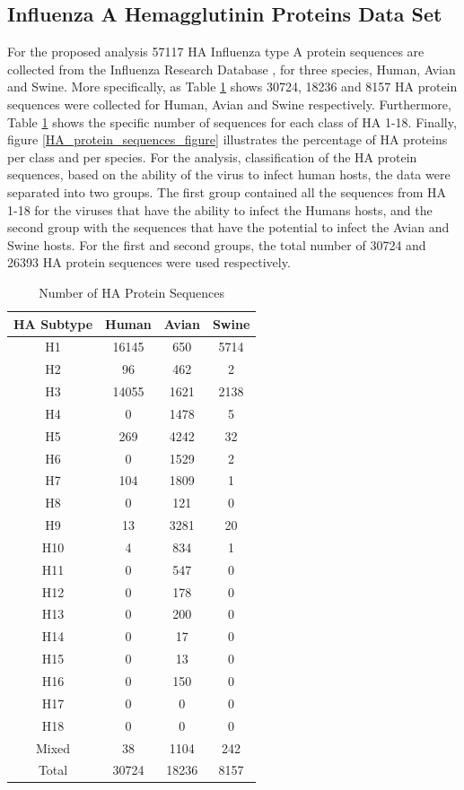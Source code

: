 \documentclass[letterpaper, 10 pt, conference]{ieeeconf}  %
\begin{document}
\subsection{Influenza A Hemagglutinin Proteins Data Set}


For the proposed analysis 57117 HA Influenza type A protein sequences are collected from the Influenza Research Database \cite{squires2012influenza}, for three species, Human, Avian and Swine. More specifically, as Table \ref{number_of_HA_proteins} shows 30724, 18236 and 8157 HA protein sequences were collected for Human, Avian and Swine respectively. Furthermore, Table \ref{number_of_HA_proteins} shows the specific number of sequences for each class of HA 1-18. Finally, figure \ref{HA_protein_sequences_figure} illustrates the percentage of HA proteins per class and per species. For the analysis, classification of the HA protein sequences, based on the ability of the virus to infect human hosts, the data were separated into two groups. The first group contained all the sequences from HA 1-18 for the viruses that have the ability to infect the Humans hosts, and the second group with the sequences that have the potential to infect the Avian and Swine hosts. For the first and second groups, the total number of 30724 and 26393 HA protein sequences were used respectively.


\begin{table}
\caption{Number of HA Protein Sequences}
\centering
\begin{tabular}{c c c c}
\hline
 HA Subtype & Human & Avian & Swine\\
 \hline
H1 & 16145 & 650 & 5714\\
H2 & 96 & 462 & 2\\
H3 & 14055 & 1621 & 2138\\
H4 & 0 & 1478 & 5\\
H5 & 269 & 4242 & 32\\
H6 & 0 & 1529 & 2\\
H7 & 104 & 1809 & 1\\
H8 & 0 & 121 & 0\\
H9 & 13 & 3281 & 20\\
H10 & 4 & 834 & 1\\
H11 & 0 & 547 & 0\\
H12 & 0 & 178 & 0\\
H13 & 0 & 200 & 0\\
H14 & 0 & 17 & 0\\
H15 & 0 & 13 & 0\\
H16 & 0 & 150 & 0\\
H17 & 0 & 0 & 0\\
H18 & 0 & 0 & 0\\
Mixed & 38 & 1104 & 242\\
\hline
Total & 30724 & 18236 & 8157\\
\hline
\end{tabular}
\label{number_of_HA_proteins}
\end{table}
\end{document}
